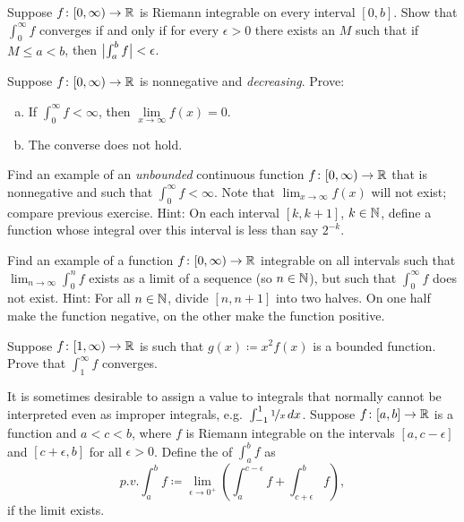 \begin{exercise}
Suppose $f \colon [0,\infty) \to {\mathbb{R}}$ is Riemann integrable on every interval
$[0,b]$.  Show that  $\int_0^\infty f$ converges if and only if
for every $\epsilon > 0$ there exists an $M$ such that if $M \leq a < b$,
then $\bigl\lvert {\int_a^b f} \bigr\rvert < \epsilon$.
\end{exercise}

\begin{exercise}
Suppose $f \colon [0,\infty) \to {\mathbb{R}}$ is nonnegative and
\emph{decreasing}.  Prove:
\begin{enumerate}[a)]
\item
If $\int_0^\infty f < \infty$, then $\lim\limits_{x\to\infty} f(x) = 0$.
\item
The converse does not hold.
\end{enumerate}
\end{exercise}

\begin{exercise}
Find an example of an \emph{unbounded} continuous function $f \colon
[0,\infty) \to {\mathbb{R}}$ that is nonnegative and such that $\int_0^\infty f < \infty$.
Note that $\lim_{x\to\infty} f(x)$ will not exist; compare
previous exercise.
Hint: On each interval $[k,k+1]$, $k \in {\mathbb{N}}$, define a function whose
integral over this interval is less than say $2^{-k}$.
\end{exercise}

\begin{exercise}
Find an example of a function $f \colon [0,\infty) \to {\mathbb{R}}$ integrable on all
intervals such that $\lim_{n\to\infty} \int_0^n f$ exists as a
limit of a sequence (so $n \in {\mathbb{N}}$), but such that
$\int_0^\infty f$ does not exist.
Hint: For all $n\in {\mathbb{N}}$, divide $[n,n+1]$ into two halves.  On one half
make the function negative, on the other make the function positive.
\end{exercise}

\begin{exercise}
Suppose $f \colon [1,\infty) \to {\mathbb{R}}$ is such that
$g(x) \coloneqq x^2 f(x)$ is a bounded function. Prove that
$\int_1^\infty f$ converges.
\end{exercise}

\begin{exnote}
It is sometimes desirable to assign a value to integrals that normally
cannot be interpreted even as improper integrals,
e.g.\ $\int_{-1}^1 \nicefrac{1}{x}\,dx$.
Suppose $f \colon [a,b] \to {\mathbb{R}}$ is a function and $a < c < b$,
where $f$ is Riemann integrable on the intervals
$[a,c-\epsilon]$ and $[c+\epsilon,b]$ for all $\epsilon > 0$.
Define
the \emph{} of $\int_a^b f$ as
\begin{equation*}
p.v.\!\int_a^b f \coloneqq \lim_{\epsilon\to 0^+}
\left(
\int_a^{c-\epsilon} f + 
\int_{c+\epsilon}^b f
\right) ,
\end{equation*}
if the limit exists.
\end{exnote}

